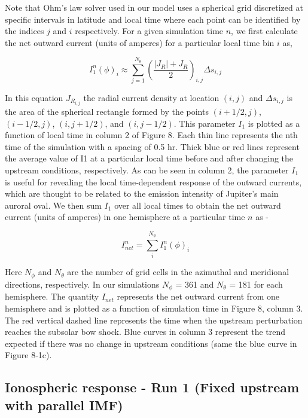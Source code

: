 Note that Ohm's law solver used in our model uses a spherical grid discretized at specific intervals in latitude and local time where each point can be identified by the indices $j$ and $i$ respectively. For a given simulation time $n$, we first calculate the net outward current (units of amperes) for a particular local time bin $i$ as,

\begin{equation}
    I_1^n \left(\phi\right)_i \approx \sum_{j=1}^{N_\theta} \left( \frac{|J_R| + J_R }{2} \right)_{i,j} \Delta s_{i,j}
\end{equation}

In this equation $J_{R_{i,j}}$ the radial current density at location $(i,j)$ and $\Delta s_{i,j}$ is the area of the spherical rectangle formed by the points $(i+1/2,j)$, $(i-1/2,j)$, $(i,j+1/2)$, and $(i,j-1/2)$. This parameter $I_1$ is plotted as a function of local time in column 2 of Figure 8. Each thin line represents the nth time of the simulation with a spacing of 0.5 hr. Thick blue or red lines represent the average value of I1 at a particular local time before and after changing the upstream conditions, respectively. As can be seen in column 2, the parameter $I_1$ is useful for revealing the local time‐dependent response of the outward currents, which are thought to be related to the emission intensity of Jupiter's main auroral oval. We then sum $I_1$ over all local times to obtain the net outward current (units of amperes) in one hemisphere at a particular time $n$ as - 

\begin{equation}
    I_{net}^n = \sum_i^{N_\phi} I_1^n(\phi)_i
\end{equation}

Here $N_\phi$ and $N_\theta$ are the number of grid cells in the azimuthal and meridional directions, respectively. In our simulations $N_\phi$ = 361 and $N_\theta$ = 181 for each hemisphere. The quantity $I_{net}$ represents the net outward current from one hemisphere and is plotted as a function of simulation time in Figure 8, column 3. The red vertical dashed line represents the time when the upstream perturbation reaches the subsolar bow shock. Blue curves in column 3 represent the trend expected if there was no change in upstream conditions (same the blue curve in Figure 8‐1c).

\subsection{Ionospheric response - Run 1 (Fixed upstream with parallel IMF)}


